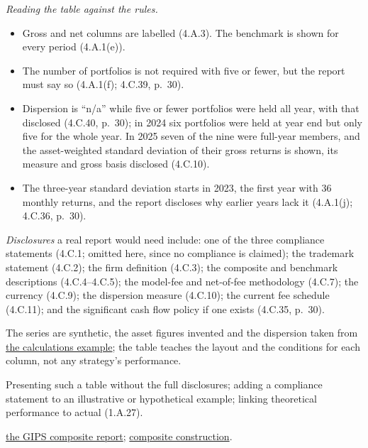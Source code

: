 \begin{qfexample}
 \emph{Reading the table against the rules.}
\begin{itemize}
\item Gross and net columns are labelled (4.A.3). The benchmark is shown for every period (4.A.1(e)).
\item The number of portfolios is not required with five or fewer, but the report must say so (4.A.1(f); 4.C.39, p.~30).
\item Dispersion is ``n/a'' while five or fewer portfolios were held all year, with that disclosed (4.C.40, p.~30); in 2024 six portfolios were held at year end but only five for the whole year. In 2025 seven of the nine were full-year members, and the asset-weighted standard deviation of their gross returns is shown, its measure and gross basis disclosed (4.C.10).
\item The three-year standard deviation starts in 2023, the first year with 36 monthly returns, and the report discloses why earlier years lack it (4.A.1(j); 4.C.36, p.~30).
\end{itemize}
\emph{Disclosures} a real report would need include: one of the three compliance statements (4.C.1; omitted here, since no compliance is claimed); the trademark statement (4.C.2); the firm definition (4.C.3); the composite and benchmark descriptions (4.C.4--4.C.5); the model-fee and net-of-fee methodology (4.C.7); the currency (4.C.9); the dispersion measure (4.C.10); the current fee schedule (4.C.11); and the significant cash flow policy if one exists (4.C.35, p.~30).

 The series are synthetic, the asset figures invented and the dispersion taken from \hyperref[meth:gips-return-calculations]{the calculations example}; the table teaches the layout and the conditions for each column, not any strategy's performance.

 Presenting such a table without the full disclosures; adding a compliance statement to an illustrative or hypothetical example; linking theoretical performance to actual (1.A.27).

 \hyperref[meth:gips-composite-presentation]{the GIPS composite report}; \hyperref[meth:gips-composite-membership]{composite construction}.

\end{qfexample}
